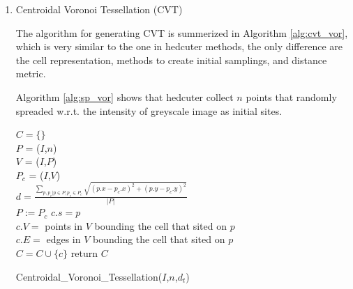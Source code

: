 \documentclass[11pt]{article}
\begin{document}
\begin{enumerate}

\item Centroidal Voronoi Tessellation (CVT)


The algorithm for generating CVT is summerized in  Algorithm \ref{alg:cvt_vor}, which is very similar  to the one in hedcuter methods, the only difference are the cell representation, methods to create initial samplings, and distance metric.

Algorithm \ref{alg:sp_vor} shows that hedcuter collect $n$ points that randomly spreaded w.r.t. the intensity of greyscale image  as initial sites.

\begin{algorithm}[H]
    	     $C = \lbrace \rbrace$\\
    	$P$ = \CreateInitialDistribution($I$,$n$)\\
    {
   	$V$ = \VoronoiFortune($I$,$P$)\\
   	$P_c$ =  \Centroidal($I$,$V$)\\
   	$d =\frac{\sum_{p,p_c | p \in P, p_c \in P_c} {\sqrt{(p.x-p_c.x)^2+(p.y-p_c.y)^2}}}{|P|} $\\
   	$P:=P_c$
   }
    {
      $c.s = p $\\
      $c.V = $ points in $V$ bounding the cell that sited on $p$\\
      $c.E = $ edges in $V$ bounding the cell that sited on $p$\\
      $C= C\cup  \lbrace c \rbrace$
   }   
      return $C$
    \caption{Centroidal\_Voronoi\_Tessellation($I$,$n$,$d_t$)}
        \label{alg:cvt_vor}
\end{algorithm}




\end{enumerate}
\end{document}
